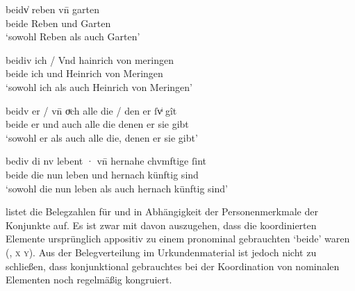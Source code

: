 \begin{exe}
\ex \label{ex:caokonj2ctrl}
	\begin{xlist}
	\ex \label{ex:caokonj2ctrl_1}
		\gll beidv̍ reben vn̄ garten \\
			beide Reben und Garten \\
		\trans `sowohl Reben als auch Garten'
			\parencites(Nr.~2353, Basel, 1296)[462,28--29]{cao3}

	\ex \label{ex:caokonj2ctrl_2}
		\gll beidiv ich / Vnd hainrich von meringen \\
			beide ich {} und Heinrich von Meringen \\
		\trans `sowohl ich als auch Heinrich von Meringen'
			\parencites(Nr.~1347, Kl.~Steingaden, Kr.~Weilheim-Schongau, 1291)[578,25]{cao1}

	\ex \label{ex:caokonj2ctrl_3}
		\gll beidv er / vn̄ oͮch alle die / den er ſvͥ gît \\
			beide er {} und auch alle die {} denen er sie gibt \\
		\trans `sowohl er als auch alle die, denen er sie gibt'
			\parencites(Nr.~1566, Hüfingen, Schwarzwald-Baar-Kr., 1292)[717,18]{cao2}

	\ex \label{ex:caokonj2ctrl_4}
		\gll bediv di nv lebent · vn̄ hernahe chvmftige ſint \\
			beide die nun leben {} und hernach künftig sind \\
		\trans `sowohl die nun leben als auch hernach künftig sind'
			\parencites(Nr.~1352, Wien, 1291)[580,8]{cao2}
	\end{xlist}
\end{exe}

 listet die Belegzahlen für  und
 in Abhängigkeit der Personenmerkmale der Konjunkte auf. Es ist
zwar mit \citet[626]{ksw2} davon auszugehen, dass die koordinierten Elemente
ursprünglich appositiv zu einem pronominal gebrauchten `beide' waren
(, \textsc{x}  \textsc{y}). Aus der Belegverteilung im
Urkundenmaterial ist jedoch nicht  zu schließen, dass konjunktional
gebrauchtes  bei der Koordination von nominalen Elementen noch
regelmäßig kongruiert.

